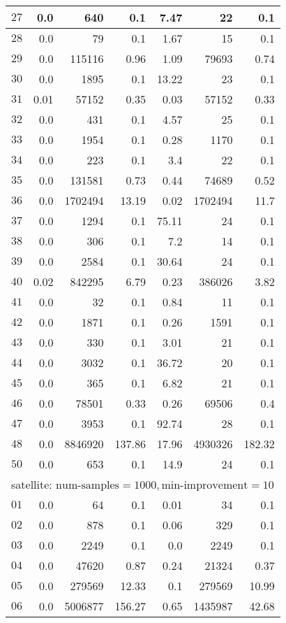 \begin{longtable}{|c||r|r|r||r|r|r|}
$27$ & 0.0 & 640 & 0.1 &7.47 & 22 & 0.1 \\\hline
$28$ & 0.0 & 79 & 0.1 &1.67 & 15 & 0.1 \\\hline
$29$ & 0.0 & 115116 & 0.96 &1.09 & 79693 & 0.74 \\\hline
$30$ & 0.0 & 1895 & 0.1 &13.22 & 23 & 0.1 \\\hline
$31$ & 0.01 & 57152 & 0.35 &0.03 & 57152 & 0.33 \\\hline
$32$ & 0.0 & 431 & 0.1 &4.57 & 25 & 0.1 \\\hline
$33$ & 0.0 & 1954 & 0.1 &0.28 & 1170 & 0.1 \\\hline
$34$ & 0.0 & 223 & 0.1 &3.4 & 22 & 0.1 \\\hline
$35$ & 0.0 & 131581 & 0.73 &0.44 & 74689 & 0.52 \\\hline
$36$ & 0.0 & 1702494 & 13.19 &0.02 & 1702494 & 11.7 \\\hline
$37$ & 0.0 & 1294 & 0.1 &75.11 & 24 & 0.1 \\\hline
$38$ & 0.0 & 306 & 0.1 &7.2 & 14 & 0.1 \\\hline
$39$ & 0.0 & 2584 & 0.1 &30.64 & 24 & 0.1 \\\hline
$40$ & 0.02 & 842295 & 6.79 &0.23 & 386026 & 3.82 \\\hline
$41$ & 0.0 & 32 & 0.1 &0.84 & 11 & 0.1 \\\hline
$42$ & 0.0 & 1871 & 0.1 &0.26 & 1591 & 0.1 \\\hline
$43$ & 0.0 & 330 & 0.1 &3.01 & 21 & 0.1 \\\hline
$44$ & 0.0 & 3032 & 0.1 &36.72 & 20 & 0.1 \\\hline
$45$ & 0.0 & 365 & 0.1 &6.82 & 21 & 0.1 \\\hline
$46$ & 0.0 & 78501 & 0.33 &0.26 & 69506 & 0.4 \\\hline
$47$ & 0.0 & 3953 & 0.1 &92.74 & 28 & 0.1 \\\hline
$48$ & 0.0 & 8846920 & 137.86 &17.96 & 4930326 & 182.32 \\\hline
$50$ & 0.0 & 653 & 0.1 &14.9 & 24 & 0.1 \\\hline

\multicolumn{7}{|l|}{satellite: $\text{num-samples}=1000,\text{min-improvement}=10$}\\\hline
$01$ & 0.0 & 64 & 0.1 &0.01 & 34 & 0.1 \\\hline
$02$ & 0.0 & 878 & 0.1 &0.06 & 329 & 0.1 \\\hline
$03$ & 0.0 & 2249 & 0.1 &0.0 & 2249 & 0.1 \\\hline
$04$ & 0.0 & 47620 & 0.87 &0.24 & 21324 & 0.37 \\\hline
$05$ & 0.0 & 279569 & 12.33 &0.1 & 279569 & 10.99 \\\hline
$06$ & 0.0 & 5006877 & 156.27 &0.65 & 1435987 & 42.68 \\\hline


\end{longtable}
